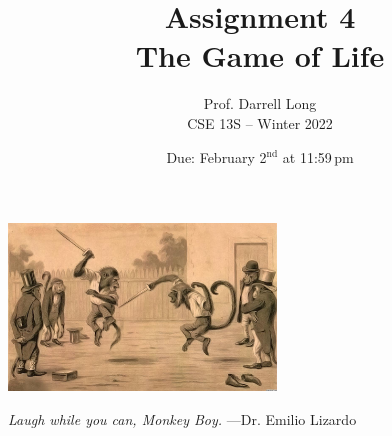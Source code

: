 \documentclass[11pt]{article}
\title{Assignment 4 \\ The Game of Life}
\author{Prof. Darrell Long \\ CSE 13S -- Winter 2022}
\date{Due: February 2$^\text{nd}$ at 11:59\,pm}
\begin{document}
\maketitle










\vspace{20pt}
\begin{center}
\includegraphics[height=1.75in]{images/monkey.jpg}
\vspace{10pt}

\emph{Laugh while you can, Monkey Boy.}
---Dr. Emilio Lizardo
\end{center}
\end{document}

